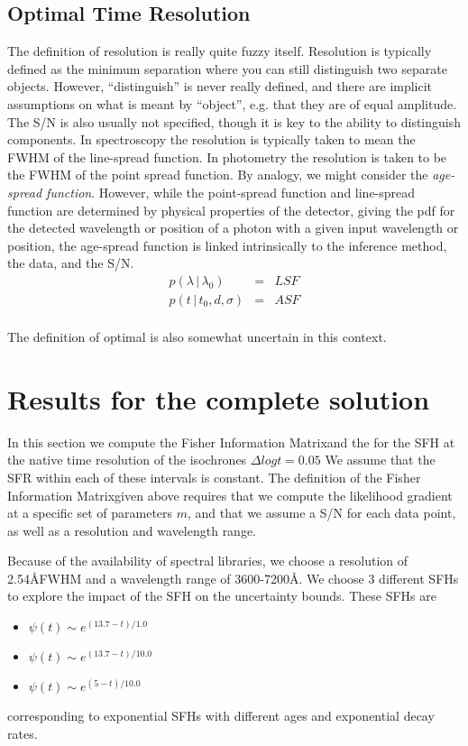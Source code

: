 \documentclass[iop,numberedappendix]{emulateapj}
\newcommand{\given}{\,|\,}
\newcommand{\fim}{Fisher Information Matrix}
\begin{document}
\subsection{Optimal Time Resolution}
The definition of resolution is really quite fuzzy itself. 
Resolution is typically defined as the minimum separation where you can still distinguish two separate objects.  
However, ``distinguish'' is never really defined, and there are implicit assumptions on what is meant by ``object'', e.g. that they are of equal amplitude.
The S/N is also usually not specified, though it is key to the ability to distinguish components.
In spectroscopy the resolution is typically taken to mean the FWHM of the line-spread function.
In photometry the resolution is taken to be the FWHM of the point spread function.
By analogy, we might consider the \emph{age-spread function}.
However, while the point-spread function and line-spread function are determined by physical properties of the detector, 
giving the pdf for the detected wavelength or position of a photon with a given input wavelength or position, 
the age-spread function is linked intrinsically to the inference method, the data, and the S/N.
\begin{eqnarray}
p(\lambda \given \lambda_0) & = & LSF \\
p(t \given t_0, d, \sigma) & = & ASF\\
\end{eqnarray}

The definition of optimal is also somewhat uncertain in this context.

\section{Results for the complete solution}
In this section we compute the \fim and the \crbound for the SFH at the native time resolution of the isochrones $\Delta log t = 0.05$
We assume that the SFR within each of these intervals is constant.
The definition of the \fim given above requires that we compute the likelihood gradient at a specific set of parameters $m$, 
and that we assume a S/N for each data point, as well as a resolution and wavelength range.

Because of the availability of spectral libraries, we choose a resolution of 2.54\AA FWHM and a wavelength range of 3600-7200\AA.
We choose 3 different SFHs to explore the impact of the SFH on the uncertainty bounds.
These SFHs are
\begin{itemize}
\item $\psi(t) \sim e^{(13.7-t)/1.0}$
\item $\psi(t) \sim e^{(13.7-t)/10.0}$
\item  $\psi(t) \sim e^{(5-t)/10.0}$
\end{itemize}
corresponding to exponential SFHs with different ages and exponential decay rates.
\end{document}
